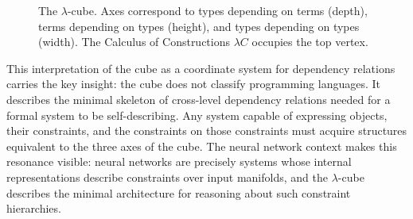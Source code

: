 \documentclass[12pt,a4paper]{article}
\theoremstyle{plain}
\theoremstyle{definition}
\begin{document}
\begin{figure}[ht]
\centering
{}
\caption{The $\lambda$-cube. Axes correspond to types depending on terms (depth),
terms depending on types (height), and types depending on types (width). The
Calculus of Constructions $\lambda C$ occupies the top vertex.}
\end{figure}

This interpretation of the cube as a coordinate system for dependency relations
carries the key insight: the cube does not classify programming languages. It
describes the minimal skeleton of cross-level dependency relations needed for a
formal system to be self-describing. Any system capable of expressing objects,
their constraints, and the constraints on those constraints must acquire
structures equivalent to the three axes of the cube. The neural network context
makes this resonance visible: neural networks are precisely systems whose
internal representations describe constraints over input manifolds, and the
$\lambda$-cube describes the minimal architecture for reasoning about such
constraint hierarchies.
\end{document}

